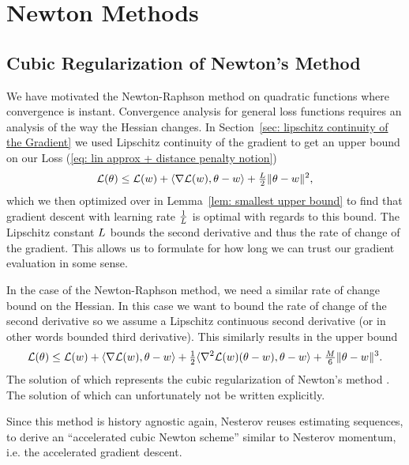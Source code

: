 \section{Newton Methods}

\subsection{Cubic Regularization of Newton's Method}

We have motivated the Newton-Raphson method on quadratic functions where
convergence is instant. Convergence analysis for general loss functions requires
an analysis of the way the Hessian changes. In Section~\ref{sec:
lipschitz continuity of the Gradient} we used Lipschitz continuity of the
gradient to get an upper bound on our Loss (\ref{eq: lin approx + distance
penalty notion})
\begin{align*}
	\mathcal{L}(\theta)
	\le \mathcal{L}(w) + \langle \nabla\mathcal{L}(w), \theta-w \rangle
	+ \tfrac{L}2 \|\theta-w\|^2,
\end{align*}
which we then optimized over in Lemma~\ref{lem: smallest upper bound} to find
that gradient descent with learning rate \(\tfrac1{L}\) is optimal with
regards to this bound. The Lipschitz constant \(L\) bounds the second
derivative and thus the rate of change of the gradient. This allows us to
formulate for how long we can trust our gradient evaluation in some sense.

In the case of the Newton-Raphson method, we need a similar rate of change
bound on the Hessian. In this case we want to bound the rate of change of the
second derivative so we assume a Lipschitz continuous second derivative (or 
in other words bounded third derivative). This similarly results in the upper
bound
\begin{align*}
	\mathcal{L}(\theta)
	\le \mathcal{L}(w) + \langle \nabla\mathcal{L}(w), \theta-w \rangle
	+ \tfrac12\langle \nabla^2\mathcal{L}(w)(\theta-w), \theta-w \rangle
	+ \tfrac{M}6\|\theta-w\|^3.
\end{align*}
The solution of which represents the cubic regularization of Newton's method
\parencite[Section 4.1]{nesterovLecturesConvexOptimization2018}.
The solution of which can unfortunately not be written explicitly.

Since this method is history agnostic again, Nesterov reuses estimating
sequences, to derive an ``accelerated cubic Newton scheme'' \parencite[Section
4.2]{nesterovLecturesConvexOptimization2018} similar to Nesterov momentum, i.e.
the accelerated gradient descent.

